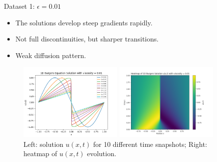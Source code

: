 \begin{secframe}

\begin{block}{Dataset 1: $\epsilon = 0.01$}
\begin{itemize}
  \item \small The solutions develop steep gradients rapidly.
  \item \small Not full discontinuities, but sharper transitions.
  \item \small Weak diffusion pattern.
\end{itemize}
\end{block}

\begin{figure}[h!]
    \centering
    \begin{minipage}[t]{0.48\linewidth}
        \centering
        \includegraphics[height=3.8cm]{images/graphical_visualization_1DBurgers_visc_001.png}
    \end{minipage}\hfill
    \begin{minipage}[t]{0.48\linewidth}
        \centering
        \includegraphics[height=3.8cm]{images/Heatmap_1DBurgers_visc_001.png}
    \end{minipage}
    \caption{\scriptsize Left: solution $u(x,t)$ for 10 different time snapshots; Right: heatmap of $u(x,t)$ evolution.}
\end{figure}

\end{secframe}

